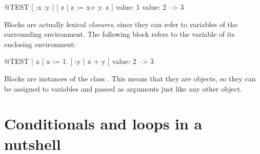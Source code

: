\documentclass[a4paper,10pt,twoside]{book}
\begin{document}
\begin{code}{@TEST}
[ :x :y | | z | z := x+ y. z ] value: 1 value: 2 --> 3
\end{code}

Blocks are actually lexical \emph{closures}, since they can refer to variables of the surrounding environment.
The following block refers to the variable  of its enclosing environment:

\begin{code}{@TEST}
| x |
x := 1.
[ :y | x + y ] value: 2 --> 3
\end{code}

Blocks are instances of the class .
This means that they are objects, so they can be assigned to variables and passed as arguments just like any other object.






\section{Conditionals and loops in a nutshell}
\end{document}
